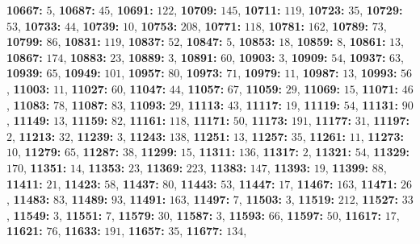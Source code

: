 \textsf{\bfseries 10667:} $5$, \textsf{\bfseries 10687:} $45$, \textsf{\bfseries 10691:} $122$, \textsf{\bfseries 10709:} $145$, \textsf{\bfseries 10711:} $119$, \textsf{\bfseries 10723:} $35$, \textsf{\bfseries 10729:} $53$, \textsf{\bfseries 10733:} $44$, \textsf{\bfseries 10739:} $10$, \textsf{\bfseries 10753:} $208$, \textsf{\bfseries 10771:} $118$, \textsf{\bfseries 10781:} $162$, \textsf{\bfseries 10789:} $73$, \textsf{\bfseries 10799:} $86$, \textsf{\bfseries 10831:} $119$, \textsf{\bfseries 10837:} $52$, \textsf{\bfseries 10847:} $5$, \textsf{\bfseries 10853:} $18$, \textsf{\bfseries 10859:} $8$, \textsf{\bfseries 10861:} $13$, \textsf{\bfseries 10867:} $174$, \textsf{\bfseries 10883:} $23$, \textsf{\bfseries 10889:} $3$, \textsf{\bfseries 10891:} $60$, \textsf{\bfseries 10903:} $3$, \textsf{\bfseries 10909:} $54$, \textsf{\bfseries 10937:} $63$, \textsf{\bfseries 10939:} $65$, \textsf{\bfseries 10949:} $101$, \textsf{\bfseries 10957:} $80$, \textsf{\bfseries 10973:} $71$, \textsf{\bfseries 10979:} $11$, \textsf{\bfseries 10987:} $13$, \textsf{\bfseries 10993:} $56$, \textsf{\bfseries 11003:} $11$, \textsf{\bfseries 11027:} $60$, \textsf{\bfseries 11047:} $44$, \textsf{\bfseries 11057:} $67$, \textsf{\bfseries 11059:} $29$, \textsf{\bfseries 11069:} $15$, \textsf{\bfseries 11071:} $46$, \textsf{\bfseries 11083:} $78$, \textsf{\bfseries 11087:} $83$, \textsf{\bfseries 11093:} $29$, \textsf{\bfseries 11113:} $43$, \textsf{\bfseries 11117:} $19$, \textsf{\bfseries 11119:} $54$, \textsf{\bfseries 11131:} $90$, \textsf{\bfseries 11149:} $13$, \textsf{\bfseries 11159:} $82$, \textsf{\bfseries 11161:} $118$, \textsf{\bfseries 11171:} $50$, \textsf{\bfseries 11173:} $191$, \textsf{\bfseries 11177:} $31$, \textsf{\bfseries 11197:} $2$, \textsf{\bfseries 11213:} $32$, \textsf{\bfseries 11239:} $3$, \textsf{\bfseries 11243:} $138$, \textsf{\bfseries 11251:} $13$, \textsf{\bfseries 11257:} $35$, \textsf{\bfseries 11261:} $11$, \textsf{\bfseries 11273:} $10$, \textsf{\bfseries 11279:} $65$, \textsf{\bfseries 11287:} $38$, \textsf{\bfseries 11299:} $15$, \textsf{\bfseries 11311:} $136$, \textsf{\bfseries 11317:} $2$, \textsf{\bfseries 11321:} $54$, \textsf{\bfseries 11329:} $170$, \textsf{\bfseries 11351:} $14$, \textsf{\bfseries 11353:} $23$, \textsf{\bfseries 11369:} $223$, \textsf{\bfseries 11383:} $147$, \textsf{\bfseries 11393:} $19$, \textsf{\bfseries 11399:} $88$, \textsf{\bfseries 11411:} $21$, \textsf{\bfseries 11423:} $58$, \textsf{\bfseries 11437:} $80$, \textsf{\bfseries 11443:} $53$, \textsf{\bfseries 11447:} $17$, \textsf{\bfseries 11467:} $163$, \textsf{\bfseries 11471:} $26$, \textsf{\bfseries 11483:} $83$, \textsf{\bfseries 11489:} $93$, \textsf{\bfseries 11491:} $163$, \textsf{\bfseries 11497:} $7$, \textsf{\bfseries 11503:} $3$, \textsf{\bfseries 11519:} $212$, \textsf{\bfseries 11527:} $33$, \textsf{\bfseries 11549:} $3$, \textsf{\bfseries 11551:} $7$, \textsf{\bfseries 11579:} $30$, \textsf{\bfseries 11587:} $3$, \textsf{\bfseries 11593:} $66$, \textsf{\bfseries 11597:} $50$, \textsf{\bfseries 11617:} $17$, \textsf{\bfseries 11621:} $76$, \textsf{\bfseries 11633:} $191$, \textsf{\bfseries 11657:} $35$, \textsf{\bfseries 11677:} $134$, 

